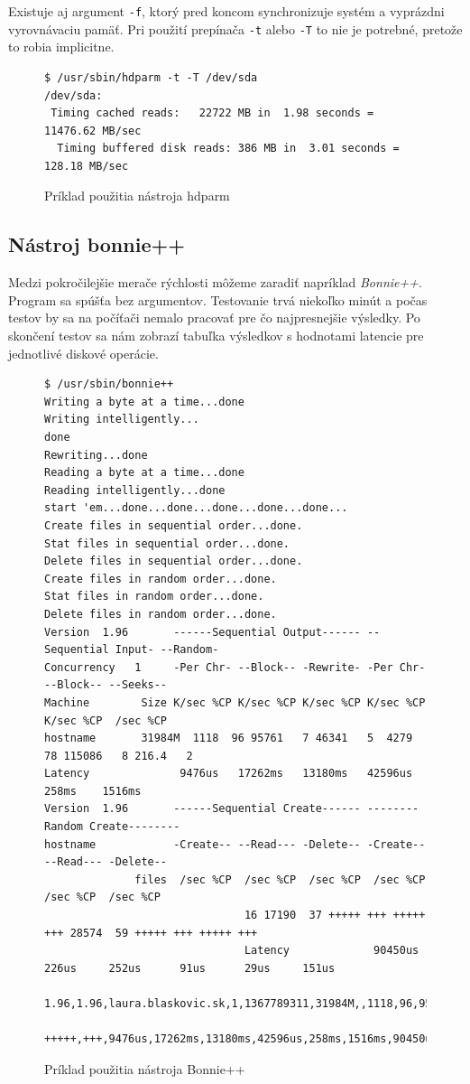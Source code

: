 Existuje aj argument \texttt{-f}, ktorý pred koncom synchronizuje systém a
vyprázdni vyrovnávaciu pamäť. Pri použití prepínača \texttt{-t} alebo
\texttt{-T} to nie je potrebné, pretože to robia implicitne.

\begin{figure}[H]
\begin{lstlisting}
$ /usr/sbin/hdparm -t -T /dev/sda
/dev/sda:
 Timing cached reads:   22722 MB in  1.98 seconds = 11476.62 MB/sec
  Timing buffered disk reads: 386 MB in  3.01 seconds = 128.18 MB/sec

\end{lstlisting}
\caption{Príklad použitia nástroja hdparm}
\label{alg:hdparm-usage}
\end{figure}

%
%

\subsection*{Nástroj bonnie++}

Medzi pokročilejšie merače rýchlosti môžeme zaradiť napríklad \emph{Bonnie++}. Program sa spúšťa bez argumentov. Testovanie trvá niekoľko minút a počas testov by sa na počíťači nemalo pracovať pre čo najpresnejšie výsledky. Po skončení testov sa nám zobrazí tabuľka výsledkov s hodnotami latencie pre jednotlivé diskové operácie.

\begin{figure}[H]
\begin{lstlisting}
$ /usr/sbin/bonnie++
Writing a byte at a time...done
Writing intelligently...
done
Rewriting...done
Reading a byte at a time...done
Reading intelligently...done
start 'em...done...done...done...done...done...
Create files in sequential order...done.
Stat files in sequential order...done.
Delete files in sequential order...done.
Create files in random order...done.
Stat files in random order...done.
Delete files in random order...done.
Version  1.96       ------Sequential Output------ --Sequential Input- --Random-
Concurrency   1     -Per Chr- --Block-- -Rewrite- -Per Chr- --Block-- --Seeks--
Machine        Size K/sec %CP K/sec %CP K/sec %CP K/sec %CP K/sec %CP  /sec %CP
hostname       31984M  1118  96 95761   7 46341   5  4279  78 115086   8 216.4   2
Latency              9476us   17262ms   13180ms   42596us     258ms    1516ms
Version  1.96       ------Sequential Create------ --------Random Create--------
hostname            -Create-- --Read--- -Delete-- -Create-- --Read--- -Delete--
              files  /sec %CP  /sec %CP  /sec %CP  /sec %CP  /sec %CP  /sec %CP
                               16 17190  37 +++++ +++ +++++ +++ 28574  59 +++++ +++ +++++ +++
                               Latency             90450us     226us     252us      91us      29us     151us
                               1.96,1.96,laura.blaskovic.sk,1,1367789311,31984M,,1118,96,95761,7,46341,5,4279,78,115086,8,216.4,2,16,,,,,17190,37,+++++,+++,+++++,+++,28574,59,+++++,+++,
                               +++++,+++,9476us,17262ms,13180ms,42596us,258ms,1516ms,90450us,226us,252us,91us,29us,151us
\end{lstlisting}
\caption{Príklad použitia nástroja Bonnie++}
\label{alg:bonnie-usage}
\end{figure}

